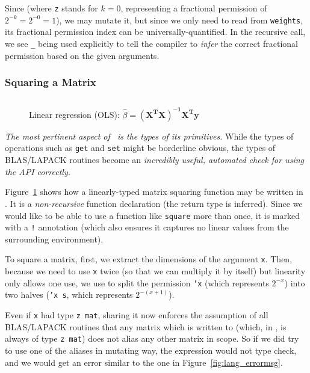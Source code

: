 Since  (where \texttt{z} stands for $k=0$, representing a
fractional permission of $2^{-k} = 2^{-0} = 1$), we may mutate it, but since we
only need to read from \texttt{weights}, its fractional permission index can be
universally-quantified. In the recursive call, we see \texttt{\_} being used
explicitly to tell the compiler to \emph{infer} the correct fractional
permission based on the given arguments.

\subsubsection{Squaring a Matrix}

\begin{figure}[t]
    \centering
    \inputminted[fontsize=\small]{ocaml}{../../test/examples/square.lt}
    \caption{Linear regression (OLS): $\hat\beta =
        \mathbf{(X^T X)^{-1} X^T y}$}\label{fig:lang_square}
\end{figure}

\emph{The most pertinent aspect of \lang\ is the types of its primitives.}
While the types of operations such as \texttt{get} and \texttt{set} might be
borderline obvious, the types of BLAS/LAPACK routines become an
\emph{incredibly useful, automated check for using the API correctly.}

Figure~\ref{fig:lang_square} shows how a linearly-typed matrix squaring
function may be written in \lang. It is a \emph{non-recursive} function
declaration (the return type is inferred). Since we would like to be able to
use a function like \texttt{square} more than once, it is marked with a
\texttt{!} annotation (which also ensures it captures no linear values from the
surrounding environment).

To square a matrix, first, we extract the dimensions of the argument
\texttt{x}. Then, because we need to use \texttt{x} twice (so that we can
multiply it by itself) but linearity only allows one use, we use  to split the permission \texttt{'x} (which
represents $2^{-x}$) into two halves (\texttt{'x s}, which represents $2^{-(x+1)}$).

Even if \texttt{x} had type \texttt{z mat}, sharing it now enforces the
assumption of all BLAS/LAPACK routines that any matrix which is written to
(which, in \lang, is always of type \texttt{z mat}) does not alias any other
matrix in scope. So if we did try to use one of the aliases in mutating way,
the expression would not type check, and we would get an error similar to the
one in Figure~\ref{fig:lang_errormsg}.

